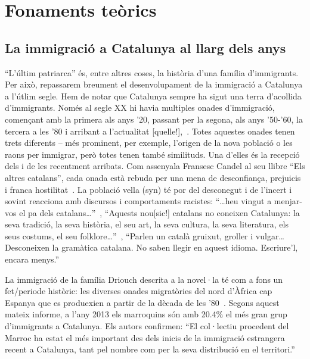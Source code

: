 \section{Fonaments teòrics}

\subsection{La immigració a Catalunya al llarg dels anys}

``L'últim patriarca'' és, entre altres coses, la història d'una família d'immigrants.
Per això, repassarem breument el desenvolupament de la immigració a Catalunya a l'útlim segle.
Hem de notar que Catalunya sempre ha sigut una terra d'acollida d'immigrants.
Només al segle XX hi havia multiples onades d'immigració, començant amb la primera als anys '20, passant per la segona, als anys '50-'60, la tercera a les '80 i arribant a l'actualitat [quelle!],~\autocite{TarPaGa2013}.
Totes aquestes onades tenen trets diferents -- més prominent, per exemple, l'origen de la nova població o les raons per immigrar, però totes tenen també similituds.
Una d'elles és la recepció dels i de les recentment arribats.
Com assenyala Fransesc Candel al seu llibre ``Els altres catalans'', cada onada està rebuda per una mena de desconfiança, prejuicis i franca hostilitat~\autocite[17]{Candel1965}.
La població vella (syn) té por del desconegut i de l'incert i sovint reacciona amb discursos i comportaments racistes:
``\ldots heu vingut a menjar-vos el pa dels catalans\ldots''~\autocite[17]{Candel1965},
``Aquests nou[sic!] catalans no coneixen Catalunya: la seva tradició, la seva història, el seu art, la seva cultura, la seva literatura, els seus costums, el seu folklore\ldots''~\autocite[17]{Candel1965},
``Parlen un català gruixut, groller i vulgar\ldots Desconeixen la gramàtica catalana. No saben llegir en aquest idioma. Escriure'l, encara menys.''~\autocite[18]{Candel1965}

La immigració de la família Driouch descrita a la novel·la té com a fons un fet/periode històric:
les diverses onades migratòries del nord d'Àfrica cap Espanya que es produexien a partir de la dècada de les '80~\autocite{TarPaGa2013}.
Segons aquest mateix informe, a l'any 2013 els marroquins són amb 20.4\% el més gran grup d'immigrants a Catalunya.
Els autors confirmen:
``El col·lectiu procedent del Marroc ha estat el més important des dels inicis de la immigració estrangera recent a Catalunya, tant pel nombre com per la seva distribució en el territori.''~\autocite{TarPaGa2013}

